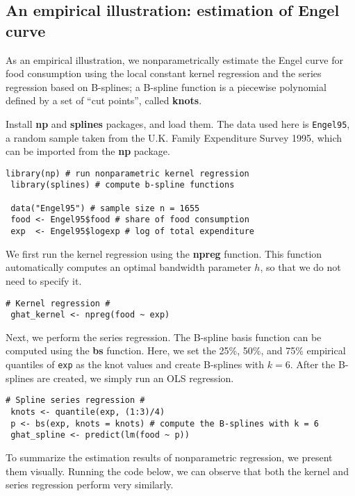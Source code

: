 \documentclass[11pt, A4paper, openany, uplatex]{book}
\begin{document}
\subsection{An empirical illustration: estimation of Engel curve}

As an empirical illustration, we nonparametrically estimate the Engel curve for food consumption using the local constant kernel regression and the series regression based on B-splines; a B-spline function is a piecewise polynomial defined by a set of ``cut points'', called \textbf{knots}.

Install \textbf{np} and \textbf{splines} packages, and load them.
The data used here is \texttt{Engel95}, a random sample taken from the U.K. Family Expenditure Survey 1995, which can be imported from the \textbf{np} package.

\begin{lstlisting}[basicstyle=\ttfamily\footnotesize, frame=single]
 library(np) # run nonparametric kernel regression
 library(splines) # compute b-spline functions

 data("Engel95") # sample size n = 1655
 food <- Engel95$food # share of food consumption
 exp  <- Engel95$logexp # log of total expenditure 
\end{lstlisting}

We first run the kernel regression using the \textbf{npreg} function.
This function automatically computes an optimal bandwidth parameter $h$, so that we do not need to specify it.

\begin{lstlisting}[basicstyle=\ttfamily\footnotesize, frame=single]
# Kernel regression #
 ghat_kernel <- npreg(food ~ exp)
\end{lstlisting}

Next, we perform the series regression.
The B-spline basis function can be computed using the \textbf{bs} function.
Here, we set the 25\%, 50\%, and 75\% empirical quantiles of \texttt{exp} as the knot values and create B-splines with $k = 6$.
After the B-splines are created, we simply run an OLS regression.

\begin{lstlisting}[basicstyle=\ttfamily\footnotesize, frame=single]
# Spline series regression #
 knots <- quantile(exp, (1:3)/4)
 p <- bs(exp, knots = knots) # compute the B-splines with k = 6
 ghat_spline <- predict(lm(food ~ p))
\end{lstlisting}

To summarize the estimation results of nonparametric regression, we present them visually.
Running the code below, we can observe that both the kernel and series regression perform very similarly.
\end{document}
